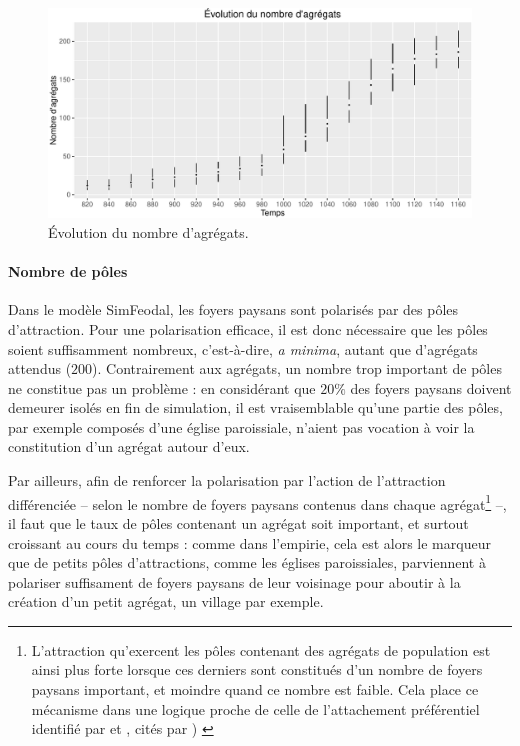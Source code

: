 \begin{figure}[H]
	\captionsetup{width=\linewidth}
	\includegraphics[width=\linewidth]{img/resultats/v0_nombre_agregats.pdf}
	\caption{Évolution du nombre d'agrégats.} 
	\label{fig:nombre-agregats-v0} 
\end{figure}


\paragraph{Nombre de pôles}\label{para:nb-poles}

Dans le modèle SimFeodal, les foyers paysans sont polarisés par des pôles d'attraction. Pour une polarisation efficace, il est donc nécessaire que les pôles soient suffisamment nombreux, c'est-à-dire, \textit{a minima}, autant que d'agrégats attendus ($200$). Contrairement aux agrégats, un nombre trop important de pôles ne constitue pas un problème : en considérant que $20\%$ des foyers paysans doivent demeurer isolés en fin de simulation, il est vraisemblable qu'une partie des pôles, par exemple composés d'une église paroissiale, n'aient pas vocation à voir la constitution d'un agrégat autour d'eux.

Par ailleurs, afin de renforcer la polarisation par l'action de l'attraction différenciée -- selon le nombre de foyers paysans contenus dans chaque agrégat\footnote{\label{ftn:preferential-attachment}
	L'attraction qu'exercent les pôles contenant des agrégats de population est ainsi plus forte lorsque ces derniers sont constitués d'un nombre de foyers paysans important, et moindre quand ce nombre est faible. Cela place ce mécanisme dans une logique proche de celle de l'attachement préférentiel identifié par \autocite{yule1925ii} et  \autocite{simon1955class}, cités par \autocite[93]{schmitt_modelisation_2014-1}) \label{ftn:attachement-preferentiel}
} --, il faut que le taux de pôles contenant un agrégat soit important, et surtout croissant au cours du temps : comme dans l'empirie, cela est alors le marqueur que de petits pôles d'attractions, comme les églises paroissiales, parviennent à polariser suffisament de foyers paysans de leur voisinage pour aboutir à la création d'un petit agrégat, un village par exemple.

